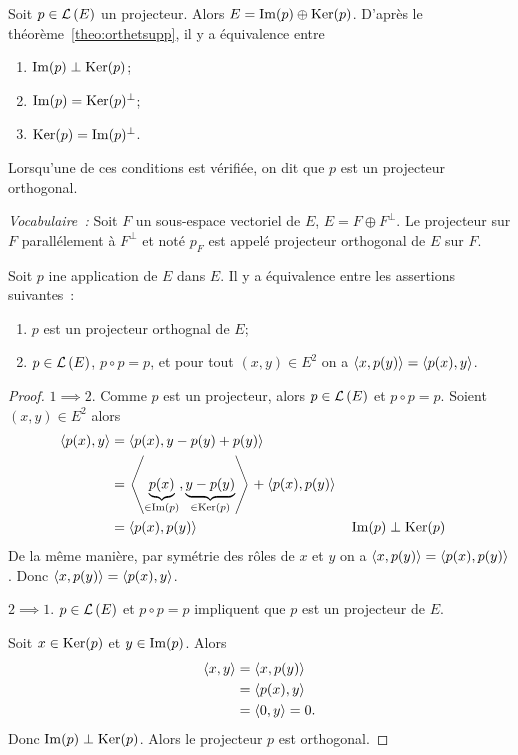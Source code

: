 Soit \(p \in \mathcal{L}\left(E\right)\) un projecteur. Alors \(E = \operatorname{Im}(p)\oplus \operatorname{Ker}(p)\). 
D'après le théorème~\ref{theo:orthetsupp}, il y a équivalence entre
\begin{enumerate}
  \item \(\operatorname{Im}(p) \perp \operatorname{Ker}(p)\);
  \item \(\operatorname{Im}(p) = \operatorname{Ker}(p)^\perp\);
  \item \(\operatorname{Ker}(p) = \operatorname{Im}(p)^\perp\).
\end{enumerate}
Lorsqu'une de ces conditions est vérifiée, on dit que \(p\) est un projecteur 
orthogonal.

\emph{Vocabulaire~:} Soit \(F\) un sous-espace vectoriel de \(E\), \(E = F 
\oplus F^\perp\). Le projecteur sur \(F\) parallélement à \(F^\perp\) et noté 
\(p_F\) est appelé projecteur orthogonal de \(E\) sur \(F\).

\begin{theo}
  Soit \(p\) ine application de \(E\) dans \(E\). Il y a équivalence entre les 
  assertions suivantes~:
  \begin{enumerate}
    \item \(p\) est un projecteur orthognal de \(E\);
    \item \(p \in \mathcal{L}\left(E\right)\), \(p \circ p =p\), et pour tout \((x,y) \in E^2\) 
      on a \(\left\langle{x},{p(y)}\right\rangle=\left\langle{p(x)},{y}\right\rangle\).
  \end{enumerate}
\end{theo}
\begin{proof}
  \(1 \implies 2\). Comme \(p\) est un projecteur, alors \(p \in \mathcal{L}\left(E\right)\) et 
  \(p \circ p =p\). Soient \((x,y) \in E^2\) alors
  \begin{align*}
    \left\langle{p(x)},{y}\right\rangle &=  \left\langle{p(x)},{y-p(y)+p(y)}\right\rangle \\
    &= \left\langle{\underbrace{p(x)}_{\in \operatorname{Im}(p)}},{\underbrace{y-p(y)}_{\in 
    \operatorname{Ker}(p)}}\right\rangle+\left\langle{p(x)},{p(y)}\right\rangle \\
    &=  \left\langle{p(x)},{p(y)}\right\rangle && \operatorname{Im}(p) \perp \operatorname{Ker}(p)
  \end{align*}
  De la même manière, par symétrie des rôles de \(x\) et \(y\) on a 
  \(\left\langle{x},{p(y)}\right\rangle=\left\langle{p(x)},{p(y)}\right\rangle\). Donc 
  \(\left\langle{x},{p(y)}\right\rangle=\left\langle{p(x)},{y}\right\rangle\).

  \(2 \implies 1\). \(p \in \mathcal{L}\left(E\right)\) et \(p \circ p =p\) impliquent que 
  \(p\) est un projecteur de \(E\).

  Soit \(x \in \operatorname{Ker}(p)\) et \(y \in \operatorname{Im}(p)\). Alors
  \begin{align*}
    \left\langle{x},{y}\right\rangle &= \left\langle{x},{p(y)}\right\rangle \\
    &=\left\langle{p(x)},{y}\right\rangle \\
    &=\left\langle{0},{y}\right\rangle=0.
  \end{align*}
  Donc \(\operatorname{Im}(p) \perp \operatorname{Ker}(p)\). Alors le projecteur \(p\) est orthogonal.
\end{proof}

